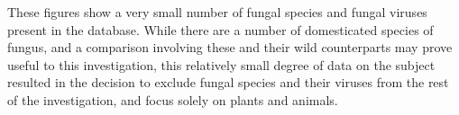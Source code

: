 \documentclass[12pt]{article}
\begin{document}
    These figures show a very small number of fungal species and fungal viruses
    present in the database. While there are a number of domesticated species of
    fungus, and a comparison involving these and their wild counterparts may
    prove useful to this investigation, this relatively small degree of data
    on the subject resulted in the decision to exclude fungal species and their
    viruses from the rest of the investigation, and focus solely on plants and
    animals.
    
\end{document}
